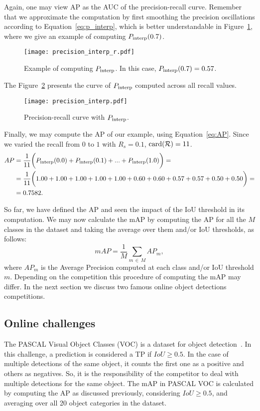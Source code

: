 Again, one may view AP as the AUC of the precision-recall curve.
Remember that we approximate the computation by first smoothing the precision oscillations according to Equation~\eqref{eq:p_interp}, which is better understandable in Figure~\ref{fig:prec-rec_curve_interp_ex},
where we give an example of computing $P_{\rm interp}(0.7)$.
%
%
\begin{figure}[th!]
	\centering
	\texttt{[image: precision\_interp\_r.pdf]}
	\caption[Example of computing $P_{\rm interp}$]{Example of computing $P_{\rm interp}$. In this case, $P_{\rm interp}(0.7) = 0.57$.}
	\label{fig:prec-rec_curve_interp_ex}
\end{figure}
%
The Figure~\ref{fig:prec-rec_curve_interp} presents the curve of $P_{\rm interp}$ computed across all recall values.
%
%
\begin{figure}[bh!]
	\centering
	\texttt{[image: precision\_interp.pdf]}
	\caption{Precision-recall curve with $P_{\rm interp}$.}
	\label{fig:prec-rec_curve_interp}
\end{figure}
%
Finally, we may compute the AP of our example, using Equation~\eqref{eq:AP}. Since we varied the recall from $0$ to $1$ with $R_s=0.1$, $\operatorname*{\textrm{card}}(\mathcal{R})=11$.
\begin{equation*}
\begin{split}
AP &= \frac{1}{11}\bigg(P_{\rm interp}(0.0)+P_{\rm interp}(0.1)+...+P_{\rm interp}(1.0)\bigg) =\\
   &= \frac{1}{11}\bigg(1.00 + 1.00 + 1.00 + 1.00 + 1.00 + 0.60 + 0.60 + 0.57 + 0.57 + 0.50 + 0.50 \bigg) =\\
   &= 0.7582.
\end{split}
\end{equation*}

So far, we have defined the AP and seen the impact of the IoU threshold in its computation.
We may now calculate the mAP by computing the AP for all the $M$ classes in the dataset and taking the average over them and/or IoU thresholds, as follows:
%
\begin{equation}
mAP = \frac{1}{M}\sum_{m\,\in\,M}AP_m,
\label{eq:mAP}
\end{equation}
%
where $AP_m$ is the Average Precision computed at each class and/or IoU threshold $m$.
%
Depending on the competition this procedure of computing the mAP may differ.
In the next section we discuss two famous online object detections competitions.

\subsection{Online challenges}
%
The PASCAL Visual Object Classes (VOC) is a dataset for object detection~\cite{Everingham10}.
In this challenge, a prediction is considered a TP if $IoU \geq 0.5$.
In the case of multiple detections of the same object, it counts the first one as a positive and others as negatives.
So, it is the responsibility of the competitor to deal with multiple detections for the same object.
The mAP in PASCAL VOC is calculated by computing the AP as discussed previously, considering $IoU \geq0.5$, and averaging over all 20 object categories in the dataset.
%


